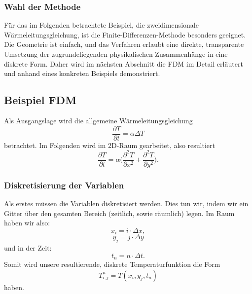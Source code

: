 \subsubsection{Wahl der Methode}

Für das im Folgenden betrachtete Beispiel, die zweidimensionale Wärmeleitungsgleichung, ist die Finite-Differenzen-Methode besonders geeignet.
Die Geometrie ist einfach, und das Verfahren erlaubt eine direkte, transparente Umsetzung der zugrundeliegenden physikalischen Zusammenhänge in eine diskrete Form.
Daher wird im nächsten Abschnitt die FDM im Detail erläutert und anhand eines konkreten Beispiels demonstriert.

\subsection{Beispiel FDM}

Als Ausgangslage wird die allgemeine Wärmeleitungsgleichung
\begin{equation}
	\frac{\partial T}{\partial t}
	=
	\alpha \Delta T
	\label{parallelisierung:eq:Wärmeleitung_alg}
\end{equation}
betrachtet.
Im Folgenden wird im 2D-Raum gearbeitet, also resultiert
\begin{equation}
	\frac{\partial T}{\partial t}
	=
	\alpha \biggl(
	\frac{\partial^2 T}{\partial x^2}
	+
	\frac{\partial^2 T}{\partial y^2}
	\biggr).
	\label{parallelisierung:eq:Wärmeleitung_2D}
\end{equation}


\subsubsection{Diskretisierung der Variablen}

Als erstes müssen die Variablen diskretisiert werden. Dies tun wir, indem wir ein Gitter über den gesamten Bereich (zeitlich, sowie räumlich) legen. Im Raum haben wir also:
\begin{equation}
	x_i
	=
	i \cdot \Delta x,
\end{equation}
\begin{equation}
	y_j
	=
	j \cdot \Delta y
\end{equation}
und in der Zeit:
\begin{equation}
	t_n
	=
	n \cdot \Delta t.
\end{equation}
Somit wird unsere resultierende, diskrete Temperaturfunktion die Form
\begin{equation}
	T^n_{i,j}
	=
	T(x_i,y_j,t_n)
\end{equation}
haben.



